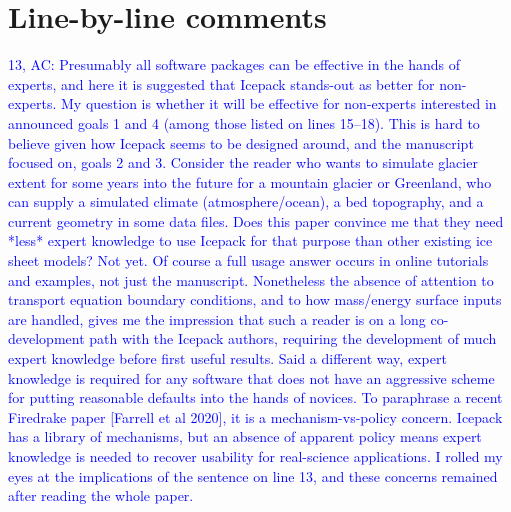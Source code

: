 \documentclass{article}
\theoremstyle{definition}
\theoremstyle{plain}
\begin{document}
\section*{Line-by-line comments}

\textcolor{blue}{13, AC:  Presumably all software packages can be effective in the hands of experts, and here it is suggested that Icepack stands-out as better for non-experts.  My question is whether it will be effective for non-experts interested in announced goals 1 and 4 (among those listed on lines 15--18).  This is hard to believe given how Icepack seems to be designed around, and the manuscript focused on, goals 2 and 3.  Consider the reader who wants to simulate glacier extent for some years into the future for a mountain glacier or Greenland, who can supply a simulated climate (atmosphere/ocean), a bed topography, and a current geometry in some data files.  Does this paper convince me that they need *less* expert knowledge to use Icepack for that purpose than other existing ice sheet models?  Not yet.  Of course a full usage answer occurs in online tutorials and examples, not just the manuscript.  Nonetheless the absence of attention to transport equation boundary conditions, and to how mass/energy surface inputs are handled, gives me the impression that such a reader is on a long co-development path with the Icepack authors, requiring the development of much expert knowledge before first useful results.  Said a different way, expert knowledge is required for any software that does not have an aggressive scheme for putting reasonable defaults into the hands of novices.  To paraphrase a recent Firedrake paper [Farrell et al 2020], it is a mechanism-vs-policy concern.  Icepack has a library of mechanisms, but an absence of apparent policy means expert knowledge is needed to recover usability for real-science applications.  I rolled my eyes at the implications of the sentence on line 13, and these concerns remained after reading the whole paper.}
\end{document}
